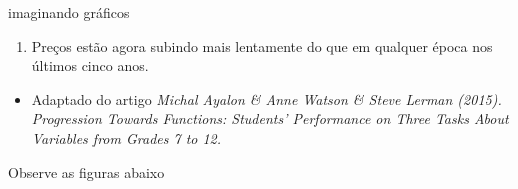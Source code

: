 \begin{task}{ imaginando gráficos}
\begin{enumerate}[label=($\Roman*$)]
\item Preços estão agora subindo mais lentamente do que em qualquer época nos últimos cinco anos.
\end{enumerate}
\begin{itemize}
\item {} 
Adaptado do artigo \emph{Michal Ayalon \& Anne Watson \& Steve Lerman (2015). Progression Towards Functions: Students’ Performance on Three Tasks About Variables from Grades 7 to 12.}
\end{itemize}
\end{task}

\clearpage
\begin{reflection}{}

Observe as figuras abaixo
\begin{figure}[H]
\centering


\end{figure}
\end{reflection}
